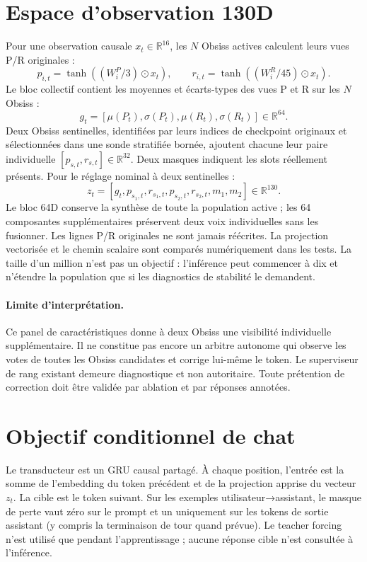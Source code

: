 \documentclass[11pt,a4paper]{report}
\begin{document}
\section{Espace d'observation 130D}
Pour une observation causale $x_t\in\mathbb{R}^{16}$, les $N$ Obsiss actives calculent leurs vues P/R originales :
\[
 p_{i,t}=\tanh((W^P_i/3)\odot x_t),\qquad
 r_{i,t}=\tanh((W^R_i/45)\odot x_t).
\]
Le bloc collectif contient les moyennes et écarts-types des vues P et R sur les $N$ Obsiss :
\[
 g_t=[\mu(P_t),\sigma(P_t),\mu(R_t),\sigma(R_t)]\in\mathbb{R}^{64}.
\]
Deux Obsiss sentinelles, identifiées par leurs indices de checkpoint originaux et sélectionnées dans une sonde stratifiée bornée, ajoutent chacune leur paire individuelle $[p_{s,t},r_{s,t}]\in\mathbb{R}^{32}$. Deux masques indiquent les slots réellement présents. Pour le réglage nominal à deux sentinelles :
\[
 z_t=[g_t, p_{s_1,t},r_{s_1,t},p_{s_2,t},r_{s_2,t},m_1,m_2]\in\mathbb{R}^{130}.
\]
Le bloc 64D conserve la synthèse de toute la population active ; les 64 composantes supplémentaires préservent deux voix individuelles sans les fusionner. Les lignes P/R originales ne sont jamais réécrites. La projection vectorisée et le chemin scalaire sont comparés numériquement dans les tests. La taille d'un million n'est pas un objectif : l'inférence peut commencer à dix et n'étendre la population que si les diagnostics de stabilité le demandent.

\paragraph{Limite d'interprétation.} Ce panel de caractéristiques donne à deux Obsiss une visibilité individuelle supplémentaire. Il ne constitue pas encore un arbitre autonome qui observe les votes de toutes les Obsiss candidates et corrige lui-même le token. Le superviseur de rang existant demeure diagnostique et non autoritaire. Toute prétention de correction doit être validée par ablation et par réponses annotées.

\section{Objectif conditionnel de chat}
Le transducteur est un GRU causal partagé. À chaque position, l'entrée est la somme de l'embedding du token précédent et de la projection apprise du vecteur $z_t$. La cible est le token suivant. Sur les exemples utilisateur→assistant, le masque de perte vaut zéro sur le prompt et un uniquement sur les tokens de sortie assistant (y compris la terminaison de tour quand prévue). Le teacher forcing n'est utilisé que pendant l'apprentissage ; aucune réponse cible n'est consultée à l'inférence.
\end{document}
